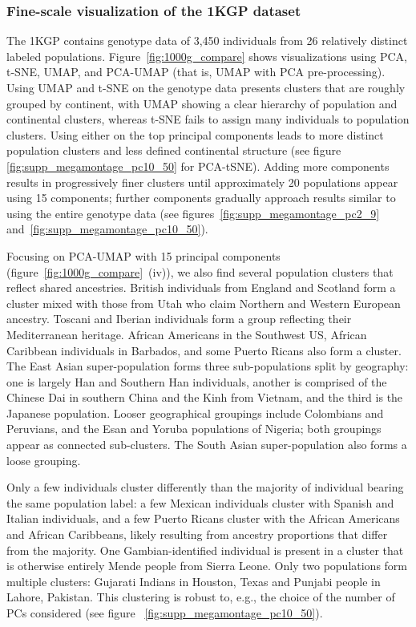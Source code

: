 \documentclass[12pt]{pnas-new}
\begin{document}
\subsubsection*{Fine-scale visualization of the 1KGP dataset} The 1KGP contains genotype data of 3,450 individuals from 26 relatively distinct labeled populations\cite{10002015global}. Figure~\ref{fig:1000g_compare} shows visualizations using PCA, t-SNE, UMAP, and PCA-UMAP (that is, UMAP with PCA pre-processing). Using UMAP and t-SNE on the genotype data presents clusters that are roughly grouped by continent, with UMAP showing a clear hierarchy of population and continental clusters, whereas t-SNE fails to assign many individuals to population clusters. Using either on the top principal components leads to more distinct population clusters and less defined continental structure (see figure \ref{fig:supp_megamontage_pc10_50} for PCA-tSNE). Adding more components results in progressively finer clusters until approximately 20 populations appear using 15 components; further components gradually approach results similar to using the entire genotype data (see figures~\ref{fig:supp_megamontage_pc2_9} and~\ref{fig:supp_megamontage_pc10_50}). 

Focusing on PCA-UMAP with 15 principal components (figure~\ref{fig:1000g_compare}~(iv)), we also find several population clusters that reflect shared ancestries. British individuals from England and Scotland form a cluster mixed with those from Utah who claim Northern and Western European ancestry. Toscani and Iberian individuals form a group reflecting their Mediterranean heritage. African Americans in the Southwest US, African Caribbean individuals in Barbados, and some Puerto Ricans also form a cluster. The East Asian super-population forms three sub-populations split by geography: one is largely Han and Southern Han individuals, another is comprised of the Chinese Dai in southern China and the Kinh from Vietnam, and the third is the Japanese population. Looser geographical groupings include Colombians and Peruvians, and the Esan and Yoruba populations of Nigeria; both groupings appear as connected sub-clusters. The South Asian super-population also forms a loose grouping. 

Only a few individuals cluster differently than the majority of individual bearing the same population label: a few Mexican individuals cluster with Spanish and Italian individuals, and a few Puerto Ricans cluster with the African Americans and African Caribbeans, likely resulting from ancestry proportions that differ from the majority. One Gambian-identified individual is present in a cluster that is otherwise entirely Mende people from Sierra Leone. Only two populations form multiple clusters: Gujarati Indians in Houston, Texas and Punjabi people in Lahore, Pakistan. This clustering is robust to, e.g., the choice of the number of PCs considered (see figure ~\ref{fig:supp_megamontage_pc10_50}).
\end{document}
